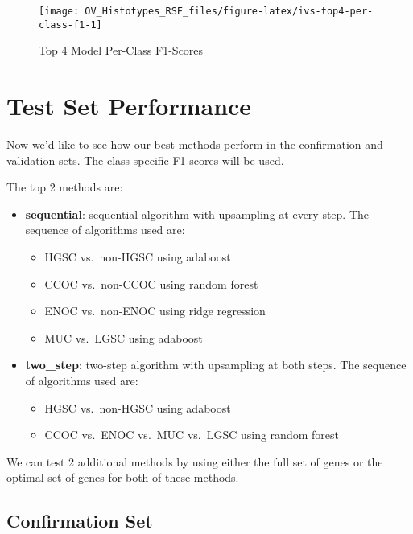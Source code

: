 \documentclass[
]{report}
\providecommand{\tightlist}{%
  \setlength{\itemsep}{0pt}\setlength{\parskip}{0pt}}
\begin{document}
\begin{figure}[H]

{\centering \texttt{[image: OV\_Histotypes\_RSF\_files/figure-latex/ivs-top4-per-class-f1-1]} 

}

\caption{Top 4 Model Per-Class F1-Scores}\label{fig:ivs-top4-per-class-f1}
\end{figure}

\hypertarget{test-set-performance}{%
\section{Test Set Performance}\label{test-set-performance}}

Now we'd like to see how our best methods perform in the confirmation and validation sets. The class-specific F1-scores will be used.

The top 2 methods are:

\begin{itemize}
\tightlist
\item
  \textbf{sequential}: sequential algorithm with upsampling at every step. The sequence of algorithms used are:

  \begin{itemize}
  \tightlist
  \item
    HGSC vs.~non-HGSC using adaboost
  \item
    CCOC vs.~non-CCOC using random forest
  \item
    ENOC vs.~non-ENOC using ridge regression
  \item
    MUC vs.~LGSC using adaboost
  \end{itemize}
\item
  \textbf{two\_step}: two-step algorithm with upsampling at both steps. The sequence of algorithms used are:

  \begin{itemize}
  \tightlist
  \item
    HGSC vs.~non-HGSC using adaboost
  \item
    CCOC vs.~ENOC vs.~MUC vs.~LGSC using random forest
  \end{itemize}
\end{itemize}

We can test 2 additional methods by using either the full set of genes or the optimal set of genes for both of these methods.

\hypertarget{confirmation-set}{%
\subsection{Confirmation Set}\label{confirmation-set}}
\end{document}
